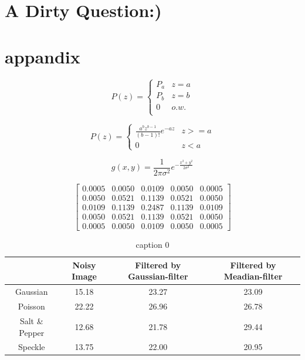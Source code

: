 \documentclass[12pt,a4paper,colorlinks=true]{article}
\begin{document}
	\newpage
	
	\section{A Dirty Question:)} \label{S05}
	
	\newpage
	
	\section{appandix} \label{appandix}

	

	\[
	P(z) = 
	\begin{cases}
		P_a & z = a\\
		P_b & z = b\\
		0 & o.w.\\
	\end{cases}
	\]
	
	
		\[
	P(z) = 
	\begin{cases}
		\frac{a^bz^{b-1}}{(b-1)!}e^{-az} & z >= a\\
		0 & z < a
	\end{cases}
	\]
	

	\begin{equation} \label{gaussianEqu}
		g(x,y) = \frac{1}{2\pi\sigma^2}e^{-\frac{x^2+y^2}{2\sigma^2}}
	\end{equation}
	
	\[
	\begin{bmatrix}
	0.0005	&	0.0050	&	0.0109	&	0.0050	&	0.0005\\
	0.0050	&	0.0521	&	0.1139	&	0.0521	&	0.0050\\
	0.0109	&	0.1139	&	0.2487	&	0.1139	&	0.0109\\
	0.0050	&	0.0521	&	0.1139	&	0.0521	&	0.0050\\
	0.0005	&	0.0050	&	0.0109	&	0.0050	&	0.0005
	\end{bmatrix}
	\]

	
		\begin{table}[ht]
			\centering

			\begin{tabular}{|c|c|c|c|}
				\hline
				& Noisy Image & Filtered by Gaussian-filter & Filtered by Meadian-filter \\  [0.5ex]
				\hline 
				Gaussian    &   15.18     &   23.27    &	23.09  \\ 
				\hline 
				Poisson  &     22.22   &   26.96    &   26.78    \\ 
				\hline 
				Salt \& Pepper  &    12.68    &    21.78    &    29.44    \\ 
				\hline 
				Speckle  &    13.75    &   22.00    &    20.95    \\ 
				\hline 
			\end{tabular} 

			\caption{caption 0}
			\label{table1}
		\end{table}
	
\end{document}

